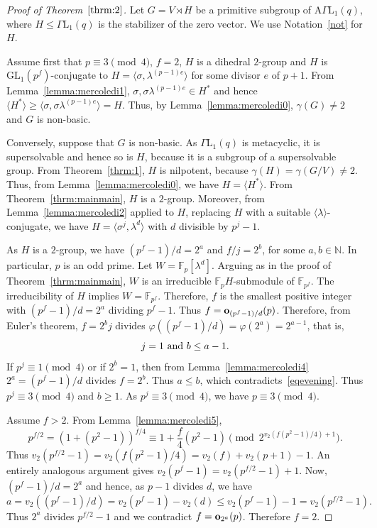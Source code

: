 \documentclass{amsart}
\begin{document}
\begin{proof}[Proof of Theorem~$\ref{thrm:2}$]
Let $G=V\rtimes H$ be a primitive subgroup of $\mathrm{A}\Gamma\mathrm{L}_1(q)$, where $H\le\Gamma\mathrm{L}_1(q)$ is the stabilizer of the zero vector. We use Notation~\ref{not} for $H$.

Assume first that $p\equiv 3\pmod 4$, $f=2$, $H$ is a dihedral $2$-group and  $H$ is $\mathrm{GL}_1(p^f)$-conjugate to $H=\langle\sigma,\lambda^{(p-1)e}\rangle$ for some divisor $e$ of $p+1$. From Lemma~\ref{lemma:mercoledi1}, $\sigma,\sigma \lambda^{(p-1)e}\in H^\ast$ and hence $\langle H^\ast\rangle\ge\langle \sigma,\sigma \lambda^{(p-1)e}\rangle=H$. Thus, by Lemma~\ref{lemma:mercoledi0}, $\gamma(G)\ne 2$ and $G$ is non-basic.

Conversely, suppose that $G$ is non-basic. As $\Gamma\mathrm{L}_1(q)$ is metacyclic, it is supersolvable and hence so is $H$, because it is a subgroup of a supersolvable group. From Theorem~\ref{thrm:1}, $H$ is nilpotent, because $\gamma(H)=\gamma(G/V)\ne 2$. Thus, from Lemma~\ref{lemma:mercoledi0}, we have $H=\langle H^\ast\rangle$. From Theorem~\ref{thrm:mainmain}, $H$ is a $2$-group. Moreover, from Lemma~\ref{lemma:mercoledi2} applied to $H$, replacing $H$ with a suitable $\langle\lambda\rangle$-conjugate, we have $H=\langle \sigma^{j},\lambda^{d}\rangle$ with $d$ divisible by $p^j-1$.

As $H$ is a $2$-group, we have $(p^f-1)/d=2^a$ and $f/j=2^b$, for some $a,b\in\mathbb{N}$. In particular, $p$ is an odd prime. Let $W=\mathbb{F}_p[\lambda^d]$. Arguing as in the proof of Theorem~\ref{thrm:mainmain}, $W$ is an irreducible $\mathbb{F}_pH$-submodule of $\mathbb{F}_{p^f}$. The irreducibility of $H$ implies $W=\mathbb{F}_{p^f}$. Therefore, $f$ is the smallest positive integer with $(p^f-1)/d=2^a$ dividing $p^f-1$. Thus $f={\bf o}_{(p^f-1)/d}(p)$. Therefore, from Euler's theorem, $f=2^bj$ divides $\varphi((p^f-1)/d)=\varphi(2^a)=2^{a-1}$, that is, 
\begin{equation}\label{eqevening}
j=1 \hbox{ and } b\le a-1.
\end{equation}
If $p^j\equiv 1\pmod 4$ or if $2^b=1$, then from Lemma~\ref{lemma:mercoledi4} $2^a=(p^f-1)/d$ divides $f=2^b$. Thus $a\le b$, which contradicts~\eqref{eqevening}. Thus $p^j\equiv 3\pmod 4$ and $b\ge 1$. As $p^j\equiv 3\pmod 4$, we have $p\equiv 3\pmod 4$.

Assume $f>2$. From Lemma~\ref{lemma:mercoledi5}, $$p^{f/2}=(1+(p^{2}-1))^{f/4}\equiv 1+\frac{f}{4}(p^2-1)\pmod {2^{v_2(f(p^2-1)/4)+1}}.$$
Thus $v_2(p^{f/2}-1)=v_{2}(f(p^{2}-1)/4)=v_2(f)+v_2(p+1)-1$. An entirely analogous argument gives $v_2(p^f-1)=v_2(p^{f/2}-1)+1$. Now, $(p^f-1)/d=2^a$ and hence, as $p-1$ divides $d$, we have $$a=v_2((p^f-1)/d)=v_2(p^f-1)-v_2(d)\le v_2(p^f-1)-1=v_2(p^{f/2}-1).$$ Thus $2^a$ divides $p^{f/2}-1$ and we contradict $f={\bf o}_{2^a}(p)$. Therefore $f=2$.


\end{proof}
\end{document}
